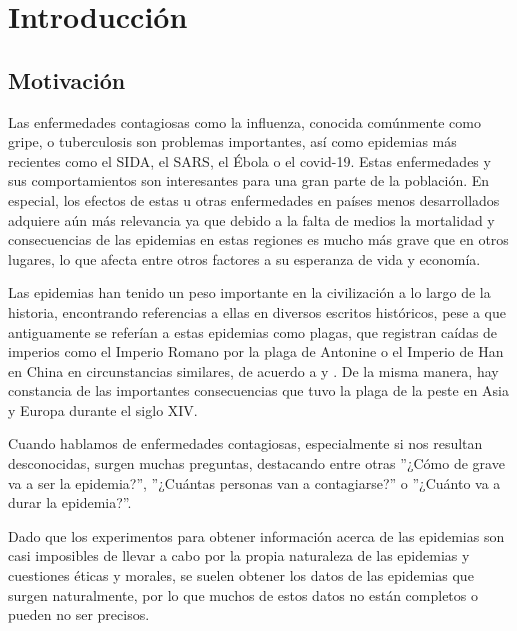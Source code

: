 
\chapter*{Introducción}

\section{Motivación}

Las enfermedades contagiosas como la influenza, conocida comúnmente como gripe, o tuberculosis son problemas importantes, así como epidemias más recientes como el SIDA, el SARS, el Ébola o el covid-19. Estas enfermedades y sus comportamientos son interesantes para una gran parte de la población. En especial, los efectos de estas u otras enfermedades en países menos desarrollados adquiere aún más relevancia ya que debido a la falta de medios la mortalidad y consecuencias de las epidemias en estas regiones es mucho más grave que en otros lugares, lo que afecta entre otros factores a su esperanza de vida y economía.

Las epidemias han tenido un peso importante en la civilización a lo largo de la historia, encontrando referencias a ellas en diversos escritos históricos, pese a que antiguamente se referían a estas epidemias como plagas, que registran caídas de imperios como el Imperio Romano por la plaga de Antonine o el Imperio de Han en China en circunstancias similares, de acuerdo a \cite{Sommerfeld2003} y \cite{duncan-jones_1996}. De la misma manera, hay constancia de las importantes consecuencias que tuvo la plaga de la peste en Asia y Europa durante el siglo XIV.

Cuando hablamos de enfermedades contagiosas, especialmente si nos resultan desconocidas, surgen muchas preguntas, destacando entre otras ''¿Cómo de grave va a ser la epidemia?'', ''¿Cuántas personas van a contagiarse?'' o ''¿Cuánto va a durar la epidemia?''.

Dado que los experimentos para obtener información acerca de las epidemias son casi imposibles de llevar a cabo por la propia naturaleza de las epidemias y cuestiones éticas y morales, se suelen obtener los datos de las epidemias que surgen naturalmente, por lo que muchos de estos datos no están completos o pueden no ser precisos.

